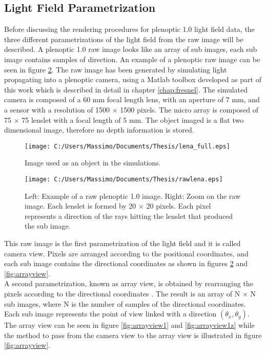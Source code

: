 \subsection{Light Field Parametrization}
\label{sec:LFparam}
Before discussing the rendering procedures for plenoptic 1.0 light field data, the three different parametrizations of the light field from the raw image will be described. A plenoptic 1.0 raw image looks like an array of sub images, each sub image contains samples of direction. An example of a plenoptic raw image can be seen in figure \ref{fig:rawlena10}. The raw image has been generated by simulating light propagating into a plenoptic camera, using a Matlab toolbox developed as part of this work which is described in detail in chapter \ref{chap:fresnel}. The simulated camera is composed of a 60 mm focal length lens, with an aperture of 7 mm, and a sensor with a resolution of 1500 $\times$ 1500 pixels. The micro array is composed of 75 $\times$ 75 lenslet with a focal length of 5 mm. The object imaged is a flat two dimensional image, therefore no depth information is stored.
\begin{figure}[H]
	\centering
	\texttt{[image: C:/Users/Massimo/Documents/Thesis/lena\_full.eps]}
	\caption{\label{fig:lenafull} Image used as an object in the simulations.}
\end{figure}
\begin{figure}[H]
	\centering
	\texttt{[image: C:/Users/Massimo/Documents/Thesis/rawlena.eps]}
	\caption{\label{fig:rawlena10}Left: Example of a raw plenoptic 1.0 image. Right: Zoom on the raw image. Each lenslet is formed by 20 $\times$ 20 pixels. Each pixel represents a direction of the rays hitting the lenslet that produced the sub image.  }
\end{figure}
This raw image is the first parametrization of the light field and it is called camera view. Pixels are arranged according to the positional coordinates, and each sub image contains the directional coordinates as shown in figures \ref{fig:rawlena10} and \ref{fig:arrayview}. \\
A second parametrization, known as array view, is obtained by rearranging the pixels according to the directional coordinates \cite{ng2006digital}. The result is an array of N $\times$ N sub images, where N is the number of samples of the directional coordinates. Each sub image represents the point of view linked with a direction $(\theta_x, \theta_y)$. The array view can be seen in figure \ref{fig:arrayview1} and \ref{fig:arrayview1z} while the method to pass from the camera view to the array view is illustrated in figure \ref{fig:arrayview}. \\
